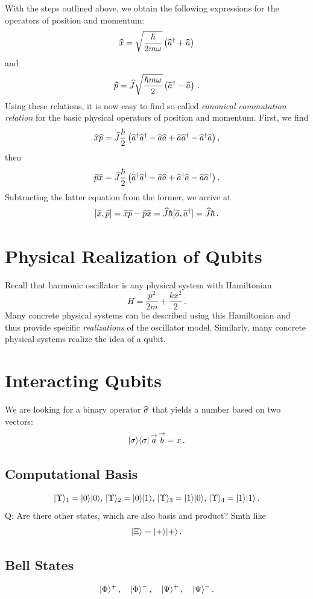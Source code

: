With the steps outlined above, we obtain the following expressions for the operators of position and momentum:
\[
\widehat{x}=\sqrt{\frac{\hbar}{2m\omega}}\left(\widehat{a}^\dagger+\widehat{a}\right)
\]
and
\[
\widehat{p}=\widehat{J}\sqrt{\frac{\hbar m\omega}{2}}\left(\widehat{a}^\dagger-\widehat{a}\right)\,.
\]
Using these relations, it is now easy to find so called \emph{canonical commutation relation} for the basic physical operators of position and momentum. First, we find
\[
\widehat{x}\widehat{p}=\widehat{J}\frac{\hbar}{2}\left(\widehat{a}^\dagger\widehat{a}^\dagger-\widehat{a}\widehat{a}+\widehat{a}\widehat{a}^\dagger-\widehat{a}^\dagger\widehat{a}\right),
\]
then
\[
\widehat{p}\widehat{x}=\widehat{J}\frac{\hbar}{2}\left(\widehat{a}^\dagger\widehat{a}^\dagger-\widehat{a}\widehat{a}+\widehat{a}^\dagger\widehat{a}-\widehat{a}\widehat{a}^\dagger\right).
\]
Subtracting the latter equation from the former, we arrive at
\[
\lbrack \widehat{x},\widehat{p}\rbrack=\widehat{x}\widehat{p}-\widehat{p}\widehat{x}=\widehat{J}\hbar\lbrack \widehat{a},\widehat{a}^\dagger\rbrack=\widehat{J}\hbar\,.
\]

\section{Physical Realization of Qubits}
Recall that harmonic oscillator is any physical system with Hamiltonian
\[
H = \frac{p^2}{2m}+\frac{kx^2}{2}\,.
\] 
Many concrete physical systems can be described using this Hamiltonian and thus provide specific \emph{realizations} of 
the oscillator model. Similarly, many concrete physical systems realize the idea of a qubit.

\section{Interacting Qubits}\label{sec:InteractingQubits}
We are looking for a binary operator $\widehat{\sigma}$ that yields a number
based on two vectors:
\[
|{\sigma}\rangle\langle{\sigma}|\,\overset{\rightarrow}{a}\,\overset{\rightarrow}{b}=x\,.
\]
\subsection{Computational Basis}
\[
|{\Upsilon}\rangle_1 = |{0}\rangle|{0}\rangle,\,|{\Upsilon}\rangle_2 = |{0}\rangle|{1}\rangle,\,
|{\Upsilon}\rangle_3 = |{1}\rangle|{0}\rangle,\,|{\Upsilon}\rangle_4 = |{1}\rangle|{1}\rangle\,.
\]
Q: Are there other states, which are also basis and product? Smth like
\[
|{\Xi}\rangle=|{+}\rangle|{+}\rangle\,.
\]

\subsection{Bell States}
\[
|{\Phi}\rangle^{+}\,,\quad|{\Phi}\rangle^{-}\,,\quad
|{\Psi}\rangle^{+}\,,\quad|{\Psi}\rangle^{-}\,.
\]


